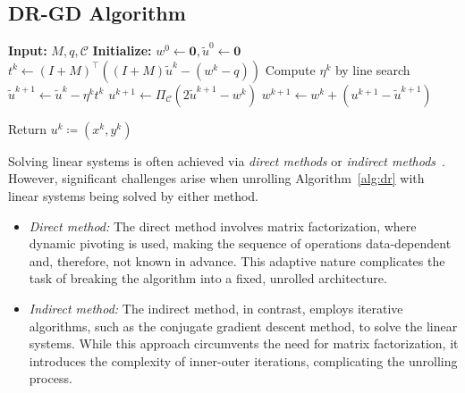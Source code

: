 \documentclass[10pt]{article} %
\begin{document}
\subsection{DR-GD Algorithm}
\label{sec:dr_gd_algo}
\begin{algorithm}[ht]
\caption{DR-GD Algorithm}\label{alg:replaced}
\begin{algorithmic}[1]
\STATE \textbf{Input:} $M, q, \mathcal{C}$
\STATE \textbf{Initialize:} $w^0\gets \mathbf{0}, \tilde{u}^0\gets \mathbf{0}$ %
    \STATE $t^k \gets (I+M)^\top ((I+M)\tilde{u}^k - (w^k-q))$
    \STATE Compute $\eta^k$ by line search
    \STATE $\tilde{u}^{k+1} \gets \tilde{u}^k - \eta^k t^k$
    \STATE $u^{k+1} \gets \Pi_\mathcal{C}\left(2 \tilde{u}^{k+1} - w^k\right)$
    \STATE $w^{k+1} \gets w^k + \left(u^{k+1} - \tilde{u}^{k+1}\right)$
\ENDFOR

\STATE Return $u^k \coloneqq (x^k, y^k)$
\end{algorithmic}
\end{algorithm}

Solving linear systems is often achieved via \textit{direct methods} or \textit{indirect methods}~\citep{stellato2020osqp,o2021operator}. 
However, significant challenges arise when unrolling Algorithm~\ref{alg:dr} with linear systems being solved by either method.
\begin{itemize}
    \item \textit{Direct method:} The direct method involves matrix factorization, where dynamic pivoting is used, making the sequence of operations data-dependent and, therefore, not known in advance.
    This adaptive nature complicates the task of breaking the algorithm into a fixed, unrolled architecture.
    \item \textit{Indirect method:} The indirect method, in contrast, employs iterative algorithms, such as the conjugate gradient descent method, to solve the linear systems. 
    While this approach circumvents the need for matrix factorization, it introduces the complexity of inner-outer iterations, complicating the unrolling process.
\end{itemize}
\end{document}

